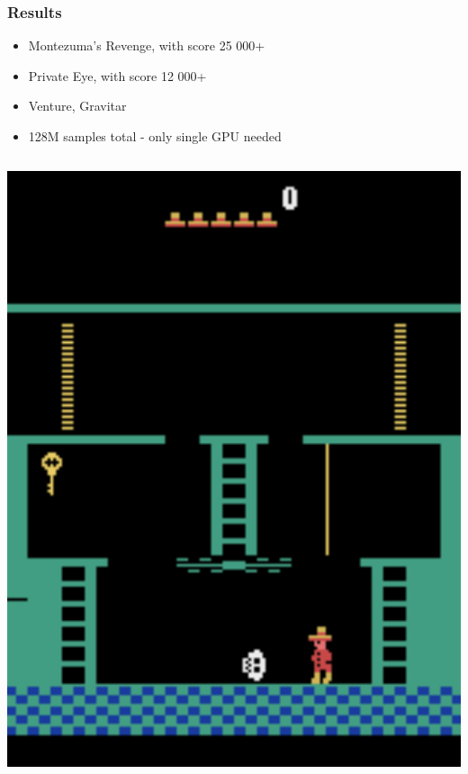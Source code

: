 \documentclass{beamer}
\begin{document}
\begin{frame}
  \frametitle{Results}

  \begin{itemize}
    \item Montezuma's Revenge, with score {\color{red}25 000+}
    \item Private Eye, with score {\color{red}12 000+}
    \item Venture, Gravitar 
    \item 128M samples total - only single GPU needed
  \end{itemize} 
  
  
  \begin{columns}
  
    \begin{column}{0.5\textwidth}
      \includegraphics[scale=0.32]{../images/montezuma.png}
    \end{column}


\end{columns}
\end{frame}
\end{document}

